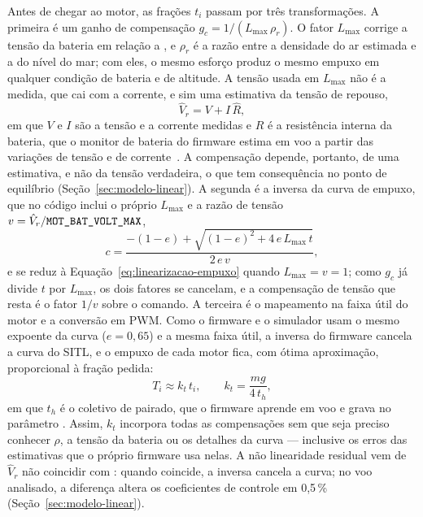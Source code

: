 Antes de chegar ao motor, as frações $t_i$ passam por três transformações. A
primeira é um ganho de compensação $g_c = 1/(L_{\max}\,\rho_r)$. O fator
$L_{\max}$ corrige a tensão da bateria em relação a
, e $\rho_r$ é a razão entre a densidade do ar
estimada e a do nível do mar; com eles, o mesmo esforço produz o mesmo empuxo
em qualquer condição de bateria e de altitude. A tensão usada em $L_{\max}$
não é a medida, que cai com a corrente, e sim uma estimativa da tensão de
repouso,
\begin{equation}
\hat V_r = V + I\,\hat R,
\label{eq:tensao-repouso}
\end{equation}
em que $V$ e $I$ são a tensão e a corrente medidas e $\hat R$ é a resistência
interna da bateria, que o monitor de bateria do firmware estima em voo a
partir das variações de tensão e de corrente~\cite{ardupilot2026}. A
compensação depende, portanto, de uma estimativa, e não da tensão
verdadeira, o que tem consequência no ponto de equilíbrio
(Seção~\ref{sec:modelo-linear}). A segunda é a inversa da curva de empuxo,
que no código inclui o próprio $L_{\max}$ e a razão de tensão
$v = \hat V_r/\texttt{MOT\_BAT\_VOLT\_MAX}$,
\begin{equation}
c = \frac{-(1-e) + \sqrt{(1-e)^2 + 4\,e\,L_{\max}\,t}}{2\,e\,v},
\label{eq:inversa-empuxo-codigo}
\end{equation}
e se reduz à Equação~\eqref{eq:linearizacao-empuxo} quando $L_{\max} = v = 1$;
como $g_c$ já divide $t$ por $L_{\max}$, os dois fatores se cancelam, e a
compensação de tensão que resta é o fator $1/v$ sobre o comando. A terceira é
o mapeamento na faixa
útil do motor e a conversão em PWM. Como o firmware e o simulador usam o mesmo
expoente da curva ($e = 0{,}65$) e a mesma faixa útil, a inversa do firmware
cancela a curva do SITL, e o empuxo de cada motor fica, com ótima aproximação,
proporcional à fração pedida:
\begin{equation}
T_i \approx k_t\,t_i, \qquad k_t = \frac{mg}{4\,t_h},
\label{eq:empuxo-linear}
\end{equation}
em que $t_h$ é o coletivo de pairado, que o firmware aprende em voo e grava
no parâmetro . Assim, $k_t$ incorpora todas as
compensações sem que seja preciso conhecer $\rho$, a tensão da bateria ou os
detalhes da curva --- inclusive os erros das estimativas que o próprio
firmware usa nelas. A não linearidade residual vem de $\hat V_r$ não
coincidir com : quando coincide, a inversa cancela
a curva; no voo analisado, a diferença altera os coeficientes de controle em
0,5\,\% (Seção~\ref{sec:modelo-linear}).

